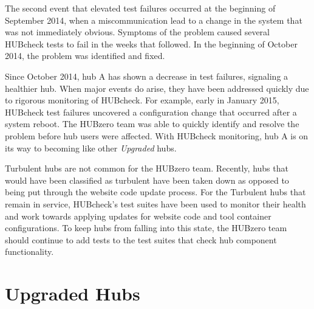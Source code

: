 
The second event that elevated test failures occurred at the beginning of
September 2014, when a miscommunication lead to a change in the system that was
not immediately obvious. Symptoms of the problem caused several HUBcheck tests
to fail in the weeks that followed. In the beginning of October 2014, the
problem was identified and fixed.


Since October 2014, hub A has shown a decrease in test failures, signaling a
healthier hub. When major events do arise, they have been addressed quickly due
to rigorous monitoring of HUBcheck. For example, early in January 2015,
HUBcheck test failures uncovered a configuration change that occurred after a
system reboot. The HUBzero team was able to quickly identify and resolve the
problem before hub users were affected. With HUBcheck monitoring, hub A is on
its way to becoming like other \textit{Upgraded} hubs.

Turbulent hubs are not common for the HUBzero team. Recently, hubs
that would have been classified as turbulent have been taken down as
opposed to being put through the website code update process. For the
Turbulent hubs that remain in service, HUBcheck's test suites have
been used to monitor their health and work towards applying updates for website
code and tool container configurations.  To keep hubs from falling into this
state, the HUBzero team should continue to add tests to the test suites that
check hub component functionality.



\section{Upgraded Hubs}
\label{sec:solution_upgraded}

% 

